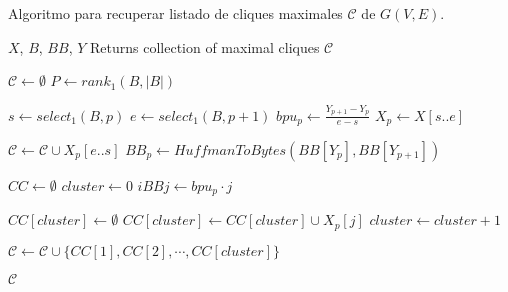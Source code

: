 \begin{algorithm}[H]
\caption{Algoritmo para recuperar listado de cliques maximales $\mathcal{C}$ de $G(V, E)$.}
\label{alg:cliques}
\begin{algorithmic}[1]
    \REQUIRE $X$, $B$, $BB$, $Y$
    \ENSURE Returns collection of maximal cliques $\mathcal{C}$

    \STATE $\mathcal{C} \leftarrow \emptyset$
    \STATE $P \leftarrow rank_{1}(B, |B|)$

        \STATE $s \leftarrow select_{1}(B, p)$
        \STATE $e \leftarrow select_{1}(B, p + 1)$
        \STATE $bpu_{p} \leftarrow \frac{Y_{p + 1} - Y_{p}}{e - s}$
        \STATE $X_{p} \leftarrow X[s..e]$
        
            \STATE $\mathcal{C} \leftarrow \mathcal{C} \cup {X_{p}[e..s]}$
       	\ELSE
       		\STATE $BB_{p} \leftarrow \mathit{HuffmanToBytes}(BB[Y_{p}], BB[Y_{p + 1}])$

		\STATE $CC \leftarrow \emptyset$
            	\STATE $cluster \leftarrow 0$
            	\STATE $iBBj \leftarrow bpu_{p} \cdot j$
            	

                		\STATE $CC[cluster] \leftarrow \emptyset$
                        	\STATE $CC[cluster] \leftarrow CC[cluster] \cup X_{p}[j]$
                    	\ENDIF
                    	\STATE $cluster \leftarrow cluster + 1$
                	\ENDFOR
                	
            	\ENDFOR
        	\ENDFOR
        \ENDIF
        
        \STATE $\mathcal{C} \leftarrow \mathcal{C} \cup \{CC[1], CC[2], \cdots, CC[cluster]\}$
    \ENDFOR

    \RETURN $\mathcal{C}$
\end{algorithmic}
\end{algorithm}
